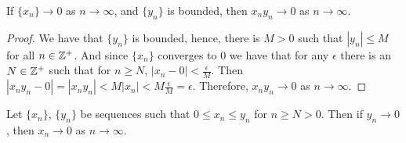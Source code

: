 \begin{corollary}
  If $\{x_n\} \rightarrow 0$ as  $n \rightarrow \infty$, and $\{y_n\}$ is
  bounded, then $x_ny_n \rightarrow 0$ as $n \rightarrow \infty$.
\end{corollary}
\begin{proof}
  We have that $\{y_n\}$ is bounded, hence, there is $M>0$ such that  $|y_n|
  \leq M$ for all  $n \in \mathbb{Z}^+$. And since $\{x_n\}$ converges to $0$ we have
  that for any $\epsilon$ there is an  $N \in \mathbb{Z}^+$ such that for  $n \geq N$,
  $|x_n-0|<\frac{\epsilon}{M}$. Then
  $|x_ny_n-0|=|x_ny_n|<M|x_n|<M\frac{\epsilon}{M}=\epsilon$. Therefore,
  $x_ny_n \rightarrow 0$ as  $n \rightarrow \infty$.
\end{proof}
\begin{corollary}
  Let $\{x_n\}$, $\{y_n\}$ be sequences such that  $0 \leq x_n \leq y_n$ for
  $n \geq N>0$. Then if  $y_n \rightarrow 0$, then  $x_n \rightarrow 0$ as
  $n \xrightarrow{} \infty$.
\end{corollary}
